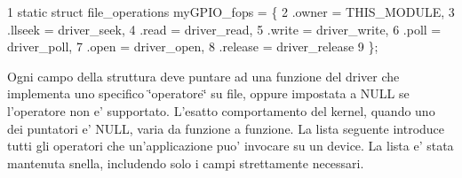 \begin{DoxyCode}
1 static struct file\_operations myGPIO\_fops = \{
2     .owner      = THIS\_MODULE,
3     .llseek     = driver\_seek,
4     .read       = driver\_read,
5     .write      = driver\_write,
6     .poll       = driver\_poll,
7     .open       = driver\_open,
8     .release    = driver\_release
9 \};
\end{DoxyCode}


Ogni campo della struttura deve puntare ad una funzione del driver che implementa uno specifico \char`\"{}operatore\char`\"{} su file, oppure impostata a N\+U\+L\+L se l'operatore non e' supportato. L'esatto comportamento del kernel, quando uno dei puntatori e' N\+U\+L\+L, varia da funzione a funzione. La lista seguente introduce tutti gli operatori che un'applicazione puo' invocare su un device. La lista e' stata mantenuta snella, includendo solo i campi strettamente necessari.


